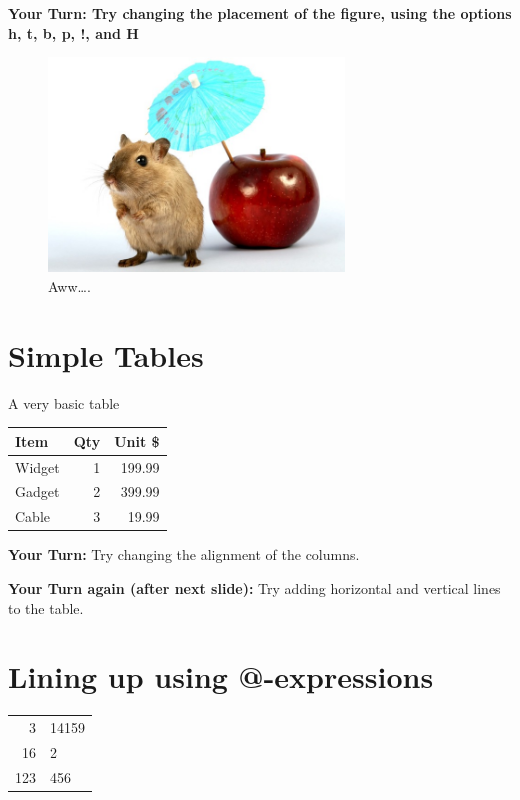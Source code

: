 \documentclass{article}
\begin{document}
{\bf Your Turn: Try changing the placement of the figure, using the options h, t, b, p, !, and H}
\begin{figure}[h]
\centering
\includegraphics[width=0.70\textwidth]{gerbil}
\caption{\label{fig:gerbil2}Aww\ldots.}
\end{figure}
\clearpage

\section{Simple Tables}

A very basic table
\bigskip

\begin{tabular}{lrr}\hline\hline
Item   & Qty & Unit \$ \\ \hline
Widget & 1   & 199.99  \\
Gadget & 2   & 399.99  \\
Cable  &3    &  19.99   \\
\hline
\end{tabular}
\bigskip

{\bf Your Turn:}
Try changing the alignment of the columns.

{\bf Your Turn again (after next slide):}
Try adding horizontal and vertical lines to the table.

\clearpage
\section{Lining up using @-expressions}

\begin{tabular}{r@{.}l} \hline
  3   & 14159 \\
  16  & 2     \\
  123 & 456   \\  \hline
\end{tabular}
\bigskip
\end{document}
